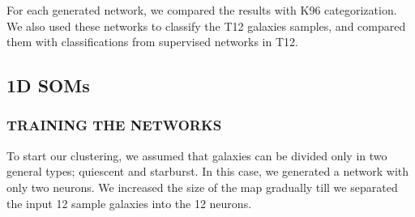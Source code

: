     For each generated network, we compared the results with K96 categorization.
    We also used these networks to classify the T12 galaxies samples, and compared them with classifications from supervised networks in T12.
    \subsection{1D SOMs}
    \label{sec: 1D}
        \subsubsection{TRAINING THE NETWORKS}
        \label{sec: 1Dt}
            To start our clustering, we assumed that galaxies can be divided only in two general types; quiescent and starburst.
            In this case, we generated a network with only two neurons.
            We increased the size of the map gradually till we separated the input 12 sample galaxies into the 12 neurons. 
        
